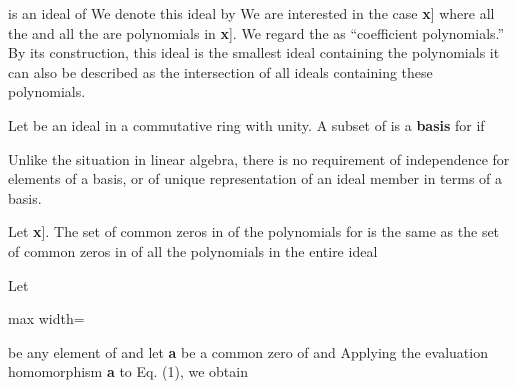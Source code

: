 \documentclass[11pt,oneside]{article}
\begin{document}
\begin{BookBody}
\noindent is an ideal of  We denote this ideal by  We are interested in the case \BookInline{R= F[}\textbf{x}] where all the  and all the  are polynomials in \BookInline{F[}\textbf{x}]. We regard the  as “coefficient polynomials.” By its construction, this ideal  is the smallest ideal containing the polynomials  it can also be described as the intersection of all ideals containing these  polynomials.

 Let  be an ideal in a commutative ring  with unity. A subset  of  is a \textbf{basis} for  if \BookEnd{\blacksquare}

Unlike the situation in linear algebra, there is no requirement of independence for elements of a basis, or of unique representation of an ideal member in terms of a basis.

 Let \BookInline{f_{1},\allowbreak f_{2},\allowbreak \cdots,\allowbreak f_{r}\in F[}\textbf{x}]. The set of common zeros in  of the polynomials  for   is the same as the set of common zeros in  of all the polynomials in the entire ideal 

 Let

\begin{center}\begin{adjustbox}{max width=\linewidth}\end{adjustbox}\end{center}

\noindent be any element of  and let\textbf{ a}  be a common zero of  and  Applying the evaluation homomorphism \BookInline{\phi }\enspace\textbf{a} to Eq. (1), we obtain


\end{BookBody}
\end{document}
